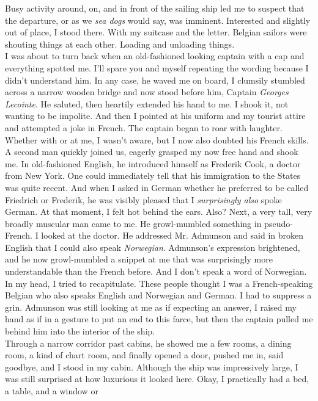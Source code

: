 \documentclass{article}
\begin{document}
  Busy
  activity around, on, and in front of the sailing ship led me to suspect that the departure, or as we \textit{sea
    dogs} would say, was imminent. Interested and slightly out of place, I stood there. With my suitcase and
  the
  letter. Belgian sailors were shouting things at each other. Loading and unloading things.\\
  \noindent I was about to turn back when an old-fashioned looking captain with a cap and everything spotted me. I'll spare
  you and myself repeating the wording because I didn't understand him. In any case, he waved me on board, I
  clumsily stumbled across a narrow wooden bridge and now stood before him, Captain \textit{Georges Lecointe}. He
  saluted, then heartily extended his hand to me. I shook it, not wanting to be impolite. And then I pointed at
  his
  uniform and my tourist attire and attempted a joke in French. The captain began to roar with laughter. Whether
  with or at me, I wasn't aware, but I now also doubted his French skills. A second man quickly joined us, eagerly
  grasped my now free hand and shook me. In old-fashioned English, he introduced himself as Frederik Cook, a
  doctor
  from New York. One could immediately tell that his immigration to the States was quite recent. And when I asked
  in
  German whether he preferred to be called Friedrich or Frederik, he was visibly pleased that I \textit{surprisingly
    also} spoke German. At that moment, I felt hot behind the ears. Also? Next, a very tall, very broadly
  muscular man came to me. He growl-mumbled something in pseudo-French. I looked at the doctor. He addressed Mr.
  Admunson and said in broken English that I could also speak \textit{Norwegian}. Admunson's expression brightened,
  and he now growl-mumbled a snippet at me that was surprisingly more understandable than the French before. And I
  don't speak a word of Norwegian. In my head, I tried to recapitulate. These people thought I was a
  French-speaking
  Belgian who also speaks English and Norwegian and German. I had to suppress a grin. Admunson was still looking
  at
  me as if expecting an answer, I raised my hand as if in a gesture to put an end to this farce, but then the
  captain pulled me behind him into the interior of the ship.\\
  \noindent Through a narrow corridor past cabins, he showed me a few rooms, a dining room, a kind of chart room, and
  finally
  opened a door, pushed me in, said goodbye, and I stood in my cabin. Although the ship was impressively large, I
  was still surprised at how luxurious it looked here. Okay, I practically had a bed, a table, and a window or
\end{document}
